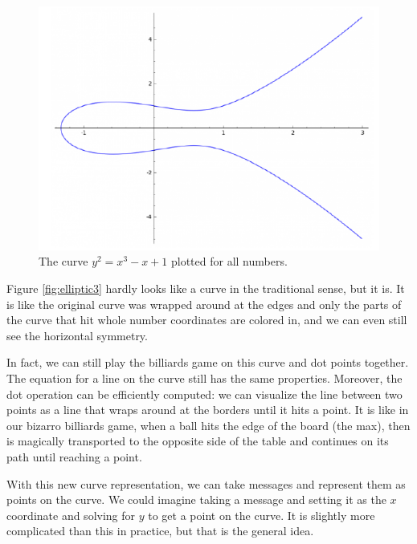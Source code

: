 \begin{figure}[H]
    \centering
    \includegraphics[scale=1]{img/elliptic2.png}
    \decoRule
    \caption{The curve $y^2 = x^3 - x + 1$ plotted for all numbers.}
    \label{fig:elliptic2}
\end{figure}

Figure \ref{fig:elliptic3} hardly looks like a curve in the traditional sense, but it is. It is like the original curve was wrapped around at the edges and only the parts of the curve that hit whole number coordinates are colored in, and we can even still see the horizontal symmetry.

In fact, we can still play the billiards game on this curve and dot points together. The equation for a line on the curve still has the same properties. Moreover, the dot operation can be efficiently computed: we can visualize the line between two points as a line that wraps around at the borders until it hits a point. It is like in our bizarro billiards game, when a ball hits the edge of the board (the max), then is magically transported to the opposite side of the table and continues on its path until reaching a point.

With this new curve representation, we can take messages and represent them as points on the curve. We could imagine taking a message and setting it as the $x$ coordinate and solving for $y$ to get a point on the curve. It is slightly more complicated than this in practice, but that is the general idea.

